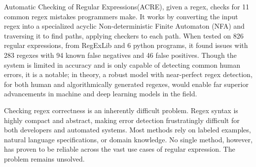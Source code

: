 \documentclass[10pt,twocolumn]{article}
\begin{document}
\begin{table}[h]
\centering
{}
\caption{ACRE Checker Summary \cite{Larson2018}}
\label{tab:acre}
\end{table}

Automatic Checking of Regular Expressions(ACRE), given a regex, checks for 11 common regex mistakes programmers make\cite{Larson2018}. It works by converting the input regex into a specialized acyclic Non-deterministic Finite Automaton (NFA) and traversing it to find paths, applying checkers to each path. When tested on 826 regular expressions, from RegExLib and 6 python programs, it found issues with 283 regexes with 94 known false negatives and 46 false positives. Though the system is limited in accuracy and is only capable of detecting common human errors, it is a notable; in theory, a robust model with near-perfect regex detection, for both human and algorithmically generated regexes, would enable far superior advancements in machine and deep learning models in the field.

Checking regex correctness is an inherently difficult problem\cite{Zheng2021}. Regex syntax is highly compact and abstract, making error detection frustratingly difficult for both developers and automated systems. Most methods rely on labeled examples, natural language specifications, or domain knowledge. No single method, however, has proven to be reliable across the vast use cases of regular expression. The problem remains unsolved.
\end{document}
